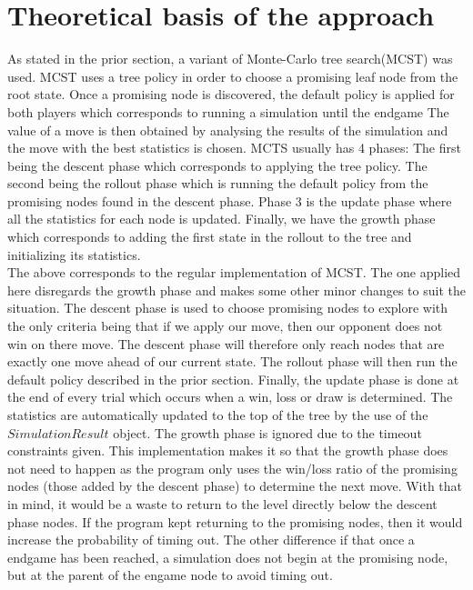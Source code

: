 \documentclass[12pt]{article} %
\begin{document}
\section{Theoretical basis of the approach}
As stated in the prior section, a variant of Monte-Carlo tree search(MCST) was used. MCST uses a tree policy in order to choose a promising leaf node from the root state.
Once a promising node is discovered, the default policy is applied for both players which corresponds to running a simulation until the endgame
The value of a move is then obtained by analysing the results of the simulation and the move with the best statistics is chosen. MCTS usually has 
4 phases: The first being the descent phase which corresponds to applying the tree policy. The second being the rollout phase which is running the default policy
from the promising nodes found in the descent phase. Phase 3 is the update phase where all the statistics for each node is updated. Finally, we have the growth phase which 
corresponds to adding the first state in the rollout to the tree and initializing its statistics. 
\\The above corresponds to the regular implementation of MCST. The one applied here disregards the growth phase and makes some other minor changes to suit the situation.
The descent phase is used to choose promising nodes to explore with the only criteria being that if we apply our move, then our opponent does not win on there move. 
The descent phase will therefore only reach nodes that are exactly one move ahead of our current state. The rollout phase will then run the default policy described in the prior section. 
Finally, the update phase is done at the end of every trial which occurs when a win, loss or draw is determined. 
The statistics are automatically updated to the top of the tree by the use of the $SimulationResult$ object. 
The growth phase is ignored due to the timeout constraints given. This implementation makes it so that the growth phase does not need to happen as the program only uses the 
win/loss ratio of the promising nodes (those added by the descent phase) to determine the next move. With that in mind, it would be a waste to return to the level directly below 
the descent phase nodes. If the program kept returning to the promising nodes, then it would increase the probability of timing out. The other difference if that once a endgame
has been reached, a simulation does not begin at the promising node, but at the parent of the engame node to avoid timing out.
\end{document}
